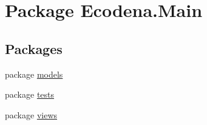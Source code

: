 \hypertarget{namespace_ecodena_1_1_main}{
\section{Package Ecodena.Main}
\label{d5/d4a/namespace_ecodena_1_1_main}
}
\subsection*{Packages}
\begin{DoxyCompactItemize}
\item 
package \hyperlink{namespace_ecodena_1_1_main_1_1models}{models}
\item 
package \hyperlink{namespace_ecodena_1_1_main_1_1tests}{tests}
\item 
package \hyperlink{namespace_ecodena_1_1_main_1_1views}{views}
\end{DoxyCompactItemize}
